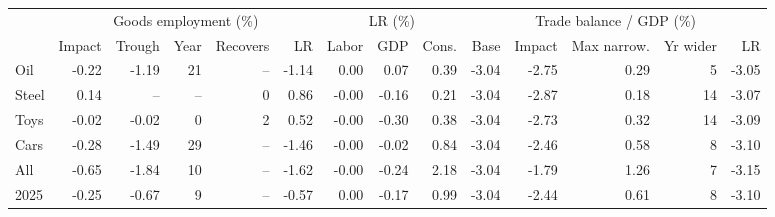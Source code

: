 \begin{tabular}{lrrrrrrrrrrrrr}
\toprule
 & \multicolumn{5}{c}{Goods employment (\%)} & \multicolumn{3}{c}{LR (\%)} & \multicolumn{5}{c}{Trade balance / GDP (\%)} \\
\cmidrule(lr){2-6}\cmidrule(lr){7-9}\cmidrule(lr){10-14}
 & Impact & Trough & Year & Recovers & LR & Labor & GDP & Cons. & Base & Impact & Max narrow. & Yr wider & LR \\
\midrule
Oil & -0.22 & -1.19 & 21 & -- & -1.14 & 0.00 & 0.07 & 0.39 & -3.04 & -2.75 & 0.29 & 5 & -3.05 \\
Steel & 0.14 & -- & -- & 0 & 0.86 & -0.00 & -0.16 & 0.21 & -3.04 & -2.87 & 0.18 & 14 & -3.07 \\
Toys & -0.02 & -0.02 & 0 & 2 & 0.52 & -0.00 & -0.30 & 0.38 & -3.04 & -2.73 & 0.32 & 14 & -3.09 \\
Cars & -0.28 & -1.49 & 29 & -- & -1.46 & -0.00 & -0.02 & 0.84 & -3.04 & -2.46 & 0.58 & 8 & -3.10 \\
All & -0.65 & -1.84 & 10 & -- & -1.62 & -0.00 & -0.24 & 2.18 & -3.04 & -1.79 & 1.26 & 7 & -3.15 \\
2025 & -0.25 & -0.67 & 9 & -- & -0.57 & 0.00 & -0.17 & 0.99 & -3.04 & -2.44 & 0.61 & 8 & -3.10 \\
\bottomrule
\end{tabular}
